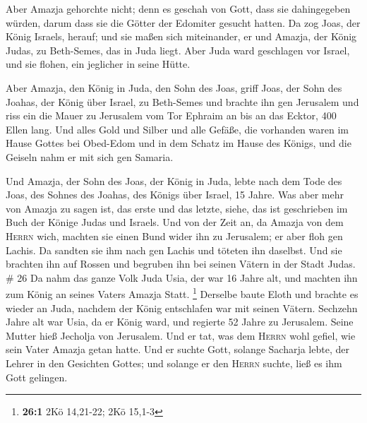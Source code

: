  Aber Amazja gehorchte nicht; denn es geschah von Gott,
dass sie dahingegeben würden, darum dass sie die Götter der Edomiter
gesucht hatten.  Da zog Joas, der König Israels, herauf;
und sie maßen sich miteinander, er und Amazja, der König Judas, zu
Beth-Semes, das in Juda liegt.  Aber Juda ward geschlagen
vor Israel, und sie flohen, ein jeglicher in seine Hütte.

 Aber Amazja, den König in Juda, den Sohn des Joas, griff
Joas, der Sohn des Joahas, der König über Israel, zu Beth-Semes und
brachte ihn gen Jerusalem und riss ein die Mauer zu Jerusalem vom Tor
Ephraim an bis an das Ecktor, 400 Ellen lang.  Und alles
Gold und Silber und alle Gefäße, die vorhanden waren im Hause Gottes bei
Obed-Edom und in dem Schatz im Hause des Königs, und die Geiseln nahm er
mit sich gen Samaria.

 Und Amazja, der Sohn des Joas, der König in Juda, lebte
nach dem Tode des Joas, des Sohnes des Joahas, des Königs über Israel,
15 Jahre.  Was aber mehr von Amazja zu sagen ist, das
erste und das letzte, siehe, das ist geschrieben im Buch der Könige
Judas und Israels.  Und von der Zeit an, da Amazja von
dem \textsc{Herrn} wich, machten sie einen Bund wider ihn zu Jerusalem;
er aber floh gen Lachis. Da sandten sie ihm nach gen Lachis und töteten
ihn daselbst.  Und sie brachten ihn auf Rossen und
begruben ihn bei seinen Vätern in der Stadt Judas. \# 26 
Da nahm das ganze Volk Juda Usia, der war 16 Jahre alt, und machten ihn
zum König an seines Vaters Amazja Statt. \footnote{\textbf{26:1} 2Kö
  14,21-22; 2Kö 15,1-3}  Derselbe baute Eloth und brachte
es wieder an Juda, nachdem der König entschlafen war mit seinen Vätern.
 Sechzehn Jahre alt war Usia, da er König ward, und
regierte 52 Jahre zu Jerusalem. Seine Mutter hieß Jecholja von
Jerusalem.  Und er tat, was dem \textsc{Herrn} wohl
gefiel, wie sein Vater Amazja getan hatte.  Und er suchte
Gott, solange Sacharja lebte, der Lehrer in den Gesichten Gottes; und
solange er den \textsc{Herrn} suchte, ließ es ihm Gott gelingen.

